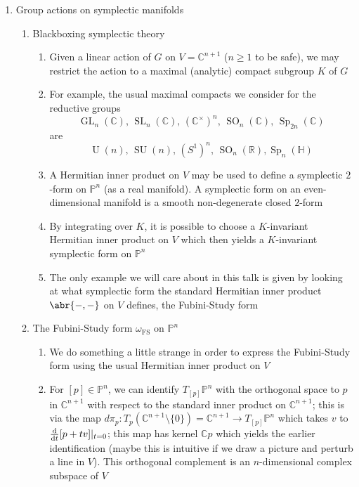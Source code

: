 \documentclass[11pt,leqno]{article}
\theoremstyle{plain}
\theoremstyle{definition}
\numberwithin{equation}{section}
\numberwithin{lem}{section}
\DeclareMathOperator{\GL}{GL}
\DeclareMathOperator{\SL}{SL}
\DeclareMathOperator{\SO}{SO}
\DeclareMathOperator{\Sp}{Sp}
\DeclareMathOperator{\U}{U}
\DeclareMathOperator{\SU}{SU}
\begin{document}
\begin{enumerate}
\begin{enumerate}
\begin{enumerate}
            \item A variant of the first example where $\mathbb C^\times$ acts on $\mathbb C^3$ by $t\cdot(x,y,z) = (t^2x,y,tz)$ produces the same action on $\mathbb P^2$, but the invariants are different: $R^G$ is $\mathbb C[y]$, so the projective quotient is a point. So the data of the action of $G$ on $V$ is required
        \end{enumerate}
    \end{enumerate}
    \item Group actions on symplectic manifolds
    \begin{enumerate}
        \item Blackboxing symplectic theory
        \begin{enumerate}
            \item Given a linear action of $G$ on $V = \mathbb C^{n+1}$ ($n\geq 1$ to be safe), we may restrict the action to a maximal (analytic) compact subgroup $K$ of $G$
            \item For example, the usual maximal compacts we consider for the reductive groups 
            \[\GL_n(\mathbb C),\, \SL_n(\mathbb C),\, (\mathbb C^\times)^n,\, \SO_n(\mathbb C),\, \Sp_{2n}(\mathbb C)\]
            are
            \[\U(n),\, \SU(n),\, (S^1)^n,\, \SO_n(\mathbb R), \Sp_n(\mathbb H)\]
            \item A Hermitian inner product on $V$ may be used to define a symplectic $2$-form on $\mathbb P^n$ (as a real manifold). A symplectic form on an even-dimensional manifold is a smooth non-degenerate closed $2$-form
            \item By integrating over $K$, it is possible to choose a $K$-invariant Hermitian inner product on $V$ which then yields a $K$-invariant symplectic form on $\mathbb P^n$
            \item The only example we will care about in this talk is given by looking at what symplectic form the standard Hermitian inner product $\abr{-,-}$ on $V$ defines, the Fubini-Study form
        \end{enumerate}
        \item The Fubini-Study form $\omega_{\mathrm{FS}}$ on $\mathbb P^n$
        \begin{enumerate}
            \item We do something a little strange in order to express the Fubini-Study form using the usual Hermitian inner product on $V$
            \item For $[p]\in\mathbb P^n$, we can identify $T_{[p]}\mathbb P^n$ with the orthogonal space to $p$ in $\mathbb C^{n+1}$ with respect to the standard inner product on $\mathbb C^{n+1}$; this is via the map $d\pi_p\colon T_p(\mathbb C^{n+1}\setminus \{0\}) = \mathbb C^{n+1}\to T_{[p]}\mathbb P^n$ which takes $v$ to $\dv{t}[p+tv]|_{t=0}$; this map has kernel $\mathbb Cp$ which yields the earlier identification (maybe this is intuitive if we draw a picture and perturb a line in $V$). This orthogonal complement is an $n$-dimensional complex subspace of $V$

\end{enumerate}
\end{enumerate}
\end{enumerate}
\end{document}
